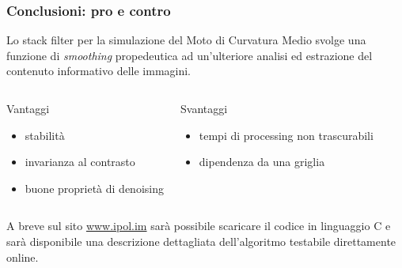 \documentclass{beamer}
\begin{document}
\begin{frame}
 
  \frametitle{Conclusioni: pro e contro}

Lo stack filter per la simulazione del Moto di Curvatura Medio svolge una funzione di \emph{smoothing} propedeutica ad un'ulteriore analisi ed estrazione del contenuto informativo delle immagini.

  \begin{columns}


    \begin{block}{Vantaggi}
     \begin{itemize}
      \item stabilit\`a
      \item invarianza al contrasto
      \item buone propriet\`a di denoising
     \end{itemize}
    \end{block}


    \begin{block}{Svantaggi}
     \begin{itemize}
      \item tempi di processing non trascurabili
      \item dipendenza da una griglia
     \end{itemize}
    \end{block}

  \end{columns}

  \begin{alertblock}{}
    A breve sul sito \url{www.ipol.im} sar\`a possibile scaricare il codice in linguaggio C e sar\`a disponibile una descrizione dettagliata dell'algoritmo testabile direttamente online.
  \end{alertblock}

\end{frame}
\end{document}
